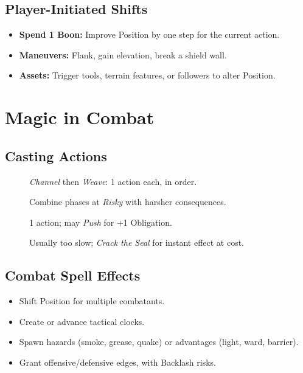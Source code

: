 \subsection{Player-Initiated Shifts}
\label{subsec:player-shifts}

\begin{itemize}
  \item \textbf{Spend 1 Boon:} Improve Position by one step for the current action. 
  \item \textbf{Maneuvers:} Flank, gain elevation, break a shield wall.
  \item \textbf{Assets:} Trigger tools, terrain features, or followers to alter Position.
\end{itemize}

\section{Magic in Combat}
\label{sec:magic-combat}

\subsection{Casting Actions}
\label{subsec:casting-actions}

\begin{description}
  \item[] \textit{Channel} then \textit{Weave}: 1 action each, in order. 
  \item[] Combine phases at \textit{Risky} with harsher consequences. 
  \item[] 1 action; may \textit{Push} for +1 Obligation. 
  \item[] Usually too slow; \textit{Crack the Seal} for instant effect at cost. 
\end{description}

\subsection{Combat Spell Effects}
\label{subsec:spell-effects}

\begin{itemize}
  \item Shift Position for multiple combatants.
  \item Create or advance tactical clocks.
  \item Spawn hazards (smoke, grease, quake) or advantages (light, ward, barrier).
  \item Grant offensive/defensive edges, with Backlash risks. 
\end{itemize}

